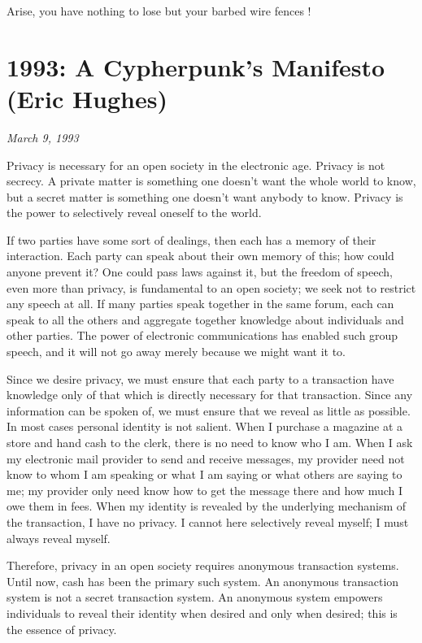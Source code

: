 \documentclass[letterpaper,12pt,english]{sphinxmanual}
\begin{document}
Arise, you have nothing to lose but your barbed wire fences !


\chapter{1993: A Cypherpunk's Manifesto (Eric Hughes)}
\label{1993::doc}\label{1993:a-cypherpunk-s-manifesto-eric-hughes}\label{1993:index-0}
\emph{March 9, 1993}

Privacy is necessary for an open society in the electronic age. Privacy is not secrecy. A private matter is something one doesn't want the whole world to know, but a secret matter is something one doesn't want anybody to know. Privacy is the power to selectively reveal oneself to the world.

If two parties have some sort of dealings, then each has a memory of their interaction. Each party can speak about their own memory of this; how could anyone prevent it? One could pass laws against it, but the freedom of speech, even more than privacy, is fundamental to an open society; we seek not to restrict any speech at all. If many parties speak together in the same forum, each can speak to all the others and aggregate together knowledge about individuals and other parties. The power of electronic communications has enabled such group speech, and it will not go away merely because we might want it to.

Since we desire privacy, we must ensure that each party to a transaction have knowledge only of that which is directly necessary for that transaction. Since any information can be spoken of, we must ensure that we reveal as little as possible. In most cases personal identity is not salient. When I purchase a magazine at a store and hand cash to the clerk, there is no need to know who I am. When I ask my electronic mail provider to send and receive messages, my provider need not know to whom I am speaking or what I am saying or what others are saying to me; my provider only need know how to get the message there and how much I owe them in fees. When my identity is revealed by the underlying mechanism of the transaction, I have no privacy. I cannot here selectively reveal myself; I must always reveal myself.

Therefore, privacy in an open society requires anonymous transaction systems. Until now, cash has been the primary such system. An anonymous transaction system is not a secret transaction system. An anonymous system empowers individuals to reveal their identity when desired and only when desired; this is the essence of privacy.
\end{document}
